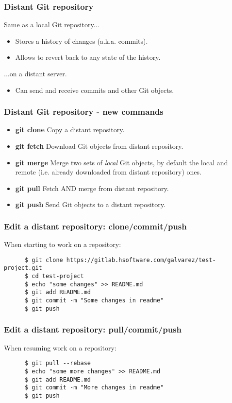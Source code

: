 \begin{frame}
\frametitle{Distant Git repository}
   Same as a local Git repository...
   \begin{itemize}
      \item Stores a history of changes (a.k.a. commits).
      \item Allows to revert back to any state of the history.
   \end{itemize}
   ...on a distant server.
   \begin{itemize}
      \item Can send and receive commits and other Git objects.
   \end{itemize}
\end{frame}

\begin{frame}
\frametitle{Distant Git repository - new commands}
   \begin{itemize}
      \item {\bf git clone} Copy a distant repository.
      \item {\bf git fetch} Download Git objects from distant repository.
      \item {\bf git merge} Merge two sets of {\it local} Git objects, by default the local and remote (i.e. already downloaded from distant repository) ones.
      \item {\bf git pull} Fetch AND merge from distant repository.
      \item {\bf git push} Send Git objects to a distant repository.
   \end{itemize}
\end{frame}

\begin{frame}[fragile]
\frametitle{Edit a distant repository: clone/commit/push}
   \small
   When starting to work on a repository:
   \begin{verbatim}
      $ git clone https://gitlab.hsoftware.com/galvarez/test-project.git
      $ cd test-project
      $ echo "some changes" >> README.md
      $ git add README.md
      $ git commit -m "Some changes in readme"
      $ git push
   \end{verbatim}
\end{frame}

\begin{frame}[fragile]
\frametitle{Edit a distant repository: pull/commit/push}
   When resuming work on a repository:
   \begin{verbatim}
      $ git pull --rebase
      $ echo "some more changes" >> README.md
      $ git add README.md
      $ git commit -m "More changes in readme"
      $ git push
   \end{verbatim}
\end{frame}

